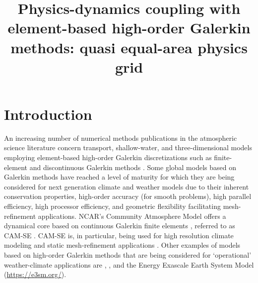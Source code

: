 \documentclass{ametsoc}
\title{Physics-dynamics coupling with element-based high-order Galerkin methods: quasi equal-area physics grid}
\affiliation{School of Marine and Atmospheric Sciences, Stony Brook University, Stony Brook, New York, USA.}
\begin{document}
\maketitle


%

\section{Introduction}
An increasing number of numerical methods publications in the atmospheric science literature concern transport, shallow-water, and three-dimensional models employing element-based high-order Galerkin discretizations such as finite-element and discontinuous Galerkin methods \citep[for an introduction to these methods see, e.g., ][]{Durran,NLL2011LNCSE,U2014GMD}. Some global models based on Galerkin methods have reached a level of maturity for which they are being considered for next generation climate and weather models due to their inherent conservation properties, high-order accuracy (for smooth problems), high parallel efficiency, high processor efficiency, and geometric flexibility facilitating mesh-refinement applications. NCAR's Community Atmosphere Model \citep[CAM; ][]{CAM5} offers a dynamical core based on continuous Galerkin finite elements \citep{TF2010JCP}, referred to as CAM-SE \citep[CAM Spectral Elements; ][]{TES2008JPCS,DetAl2012IJHPCA,LetAl2018JAMES}. CAM-SE is, in particular, being used for high resolution climate modeling \citep[e.g., ][]{JAME:JAME20125,RetAl2015GRL,BETAL2018CC} and static mesh-refinement applications \citep[e.g., ][]{FT2004MWR,ZetAl2014JC,ZetAl2014JCb,GetAl2014GMD,RHUZ2016JAMC}. Other examples of models based on high-order Galerkin methods that are being considered for `operational' weather-climate applications are \citet{Giraldo20083849}, \citet{NCT2009CF}, \citet{BSBDK2013TCFD} and the Energy Exascale Earth System Model (\url{https://e3sm.org/}).
\end{document}
